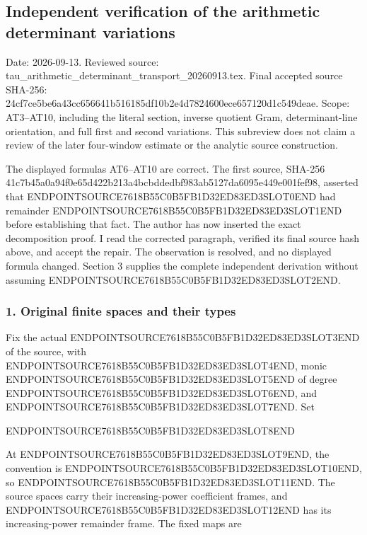 \subsection{Independent verification of the arithmetic determinant variations}\label{endpoint-variation_review--independent-verification-of-the-arithmetic-determinant-variations}

Date: 2026-09-13. Reviewed source: tau\_arithmetic\_determinant\_transport\_20260913.tex. Final accepted source SHA-256: 24cf7ce5be6a43cc656641b516185df10b2e4d7824600ece657120d1c549deae. Scope: AT3--AT10, including the literal section, inverse quotient Gram, determinant-line orientation, and full first and second variations. This subreview does not claim a review of the later four-window estimate or the analytic source construction.

The displayed formulas AT6--AT10 are correct. The first source, SHA-256 41c7b45a0a94f0e65d422b213a4bcbddedbf983ab5127da6095e449e001fef98, asserted that ENDPOINTSOURCE7618B55C0B5FB1D32ED83ED3SLOT0END had remainder ENDPOINTSOURCE7618B55C0B5FB1D32ED83ED3SLOT1END before establishing that fact. The author has now inserted the exact decomposition proof. I read the corrected paragraph, verified its final source hash above, and accept the repair. The observation is resolved, and no displayed formula changed. Section 3 supplies the complete independent derivation without assuming ENDPOINTSOURCE7618B55C0B5FB1D32ED83ED3SLOT2END.

\subsubsection{1. Original finite spaces and their types}\label{endpoint-variation_review--original-finite-spaces-and-their-types}

Fix the actual ENDPOINTSOURCE7618B55C0B5FB1D32ED83ED3SLOT3END of the source, with ENDPOINTSOURCE7618B55C0B5FB1D32ED83ED3SLOT4END, monic ENDPOINTSOURCE7618B55C0B5FB1D32ED83ED3SLOT5END of degree ENDPOINTSOURCE7618B55C0B5FB1D32ED83ED3SLOT6END, and ENDPOINTSOURCE7618B55C0B5FB1D32ED83ED3SLOT7END. Set

ENDPOINTSOURCE7618B55C0B5FB1D32ED83ED3SLOT8END

At ENDPOINTSOURCE7618B55C0B5FB1D32ED83ED3SLOT9END, the convention is ENDPOINTSOURCE7618B55C0B5FB1D32ED83ED3SLOT10END, so ENDPOINTSOURCE7618B55C0B5FB1D32ED83ED3SLOT11END. The source spaces carry their increasing-power coefficient frames, and ENDPOINTSOURCE7618B55C0B5FB1D32ED83ED3SLOT12END has its increasing-power remainder frame. The fixed maps are

